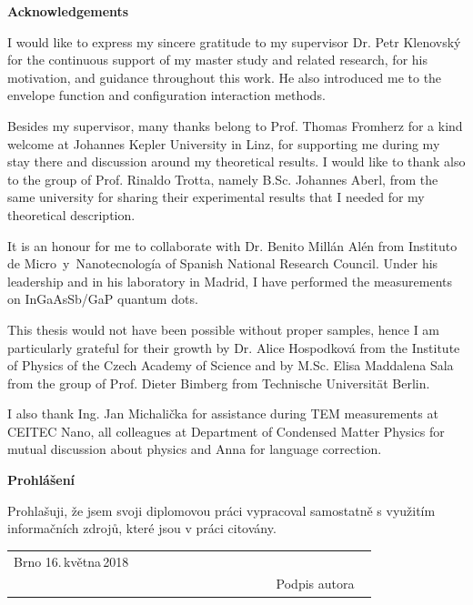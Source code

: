 \documentclass[
a4paper, %
11pt, %
onecolumn, %
openany, %
oldfontcommands,
]{memoir}
\begin{document}
\cleardoublepage
\noindent\Large\textbf{Acknowledgements}\\ \normalsize

\noindent I would like to express my sincere gratitude to my supervisor Dr. Petr Klenovský for the continuous support of my master study and related research, for his motivation, and guidance throughout this work. He also introduced me to the envelope function and configuration interaction methods. 

Besides my supervisor, many thanks belong to Prof. Thomas Fromherz for a kind welcome at Johannes Kepler University in Linz, for supporting me during my stay there and discussion around my theoretical results. I would like to thank also to the group of Prof. Rinaldo Trotta, namely B.Sc. Johannes Aberl, from the same university for sharing their experimental results that I needed for my theoretical description.

It is an honour for me to collaborate with Dr. Benito Millán Alén from Instituto de Micro~y~Nanotecnología of Spanish National Research Council. Under his leadership and in his laboratory in Madrid, I have performed the measurements on InGaAsSb/GaP quantum dots.


This thesis would not have been possible without proper samples, hence I am particularly grateful for their growth by Dr. Alice Hospodková from the Institute of Physics of the Czech Academy of Science and by M.Sc. Elisa Maddalena Sala from the group of Prof. Dieter Bimberg from Technische Universität Berlin.

I also thank Ing. Jan Michalička for assistance during TEM measurements at CEITEC Nano, all colleagues at Department of Condensed Matter Physics for mutual discussion about physics and Anna for language correction.


\vfill
\noindent\Large\textbf{Prohlášení}\\ \normalsize

\noindent Prohlašuji, že jsem svoji diplomovou práci vypracoval samostatně
s využitím informačních zdrojů, které jsou v práci citovány.
\vspace{1cm}
\begin{center}
	\centering
	\begin{tabular}{p{0.5\linewidth}p{0.15\linewidth}p{0.25\linewidth}}
		Brno 16.\,května\,2018 &  & \\\cmidrule[0.5pt]{3-3}
		&&\centering Podpis autora \\ 
	\end{tabular}
\end{center}
\end{document}
